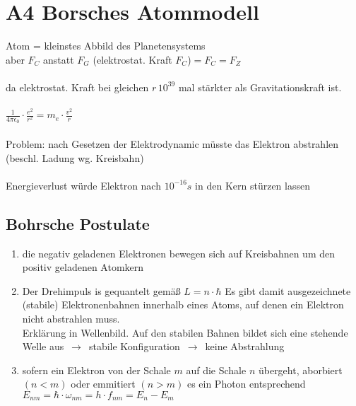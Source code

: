 \section{A4 Borsches Atommodell}
Atom = kleinstes Abbild des Planetensystems
\\
aber $F_C$ anstatt $F_G$ (elektrostat. Kraft $F_C$)$ = F_C = F_Z$
\\
\\
da elektrostat. Kraft bei gleichen $r \, 10^{39}$ mal stärkter als Gravitationskraft ist.
\\
\\
\mbox{\Large $\frac{1}{4 \pi \epsilon_0} \cdot \frac{e^2}{r^2} = m_e \cdot \frac{v^2}{r}$}
\\
\\
Problem: nach Gesetzen der Elektrodynamic müsste das Elektron abstrahlen (beschl. Ladung wg. Kreisbahn)
\\
\\
Energieverlust würde Elektron nach $10^{-16}s$ in den Kern stürzen lassen

\subsection{Bohrsche Postulate}

\begin{enumerate}
    \item die negativ geladenen Elektronen bewegen sich auf Kreisbahnen um den positiv geladenen Atomkern
    \item {\color{red} Der Drehimpuls is gequantelt gemäß \mbox{\Large $L = n \cdot \hbar$} Es gibt damit ausgezeichnete
    (stabile) Elektronenbahnen innerhalb eines Atoms, auf denen ein Elektron nicht abstrahlen muss.
    \\
    Erklärung in Wellenbild. Auf den stabilen Bahnen bildet sich eine stehende Welle aus $\,\to\,$ stabile Konfiguration $\,\to\,$ keine Abstrahlung}
    \item sofern ein Elektron von der Schale $m$ auf die Schale $n$ übergeht, aborbiert $(n<m)$ oder
    emmitiert $(n > m)$ es ein Photon entsprechend \\
    \mbox{\Large $ E_{nm} = \hbar \cdot \omega_{nm} = h \cdot f_{nm} = E_n - E_m$}
\end{enumerate}
